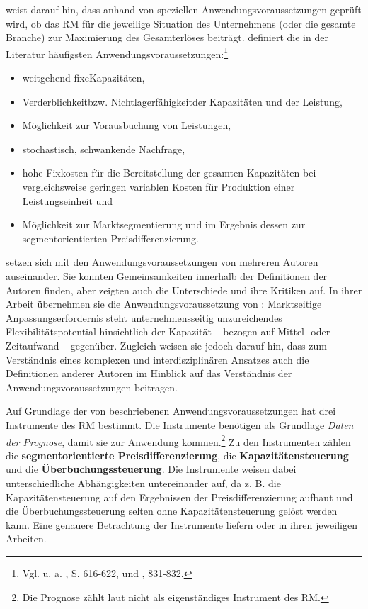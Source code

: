 \cite{Petrick:2009aa} weist da\-rauf hin, dass anhand von speziellen Anwendungsvoraussetzungen geprüft wird, ob das RM für die jeweilige Situation des Unternehmens (oder die gesamte Branche) zur Maximierung des Gesamterlöses beiträgt. \cite{kimes1989yield} definiert die in der Literatur häufigsten Anwendungsvoraussetzungen:\footnote{Vgl. u. a. \cite{friege1996yield}, S. 616-622, und \cite{weatherford1992taxonomy}, 831-832.}
\begin{itemize}
	\item \glqq weitgehend fixe\grqq\;Kapazitäten,
	\item \glqq Verderblichkeit\grqq\;bzw. \glqq Nichtlagerfähigkeit\grqq\;der Kapazitäten und der Leistung,
	\item Möglichkeit zur Vorausbuchung von Leistungen,
	\item stochastisch, schwankende Nachfrage,
	\item hohe Fixkosten für die Bereitstellung der gesamten Kapazitäten bei vergleichsweise geringen variablen Kosten für Produktion einer Leistungseinheit und
	\item Möglichkeit zur Marktsegmentierung und im Ergebnis dessen zur segmentorientierten Preisdifferenzierung.
\end{itemize}
\vspace{0.2cm}

\cite{Klein:2008aa} setzen sich mit den Anwendungsvoraussetzungen von mehreren Autoren auseinander. Sie konnten Gemeinsamkeiten innerhalb der Definitionen der Autoren finden, aber zeigten auch die Unterschiede und ihre Kritiken auf. In ihrer Arbeit übernehmen sie die Anwendungsvoraussetzung von \cite{corsten1998yield}: \glqq Marktseitige Anpassungserfordernis steht unternehmensseitig unzureichendes Flexibilitätspotential hinsichtlich der Kapazität -- bezogen auf Mittel- oder Zeitaufwand -- gegenüber\grqq. Zugleich weisen sie jedoch darauf hin, dass zum Verständnis eines komplexen und interdisziplinären Ansatzes auch die Definitionen anderer Autoren im Hinblick auf das Verständnis der Anwendungsvoraussetzungen beitragen.

Auf Grundlage der von \cite{friege1996yield} beschriebenen Anwendungsvoraussetzungen hat \cite{Petrick:2009aa} drei Instrumente des RM bestimmt. Die Instrumente benötigen als Grundlage \textit{Daten der Prognose}, damit sie zur Anwendung kommen.\footnote{Die Prognose zählt laut \cite{Petrick:2009aa} nicht als eigenständiges Instrument des RM.} Zu den Instrumenten zählen die \textbf{segmentorientierte Preisdifferenzierung}, die \textbf{Kapazitäten\-steuerung} und die \textbf{Über\-buchungssteuerung}. Die Instrumente weisen dabei unterschiedliche Ab\-hängigkeit\-en untereinander auf, da z. B. die Kapazitä\-tensteu\-erung auf den Ergebnissen der Preisdifferenzierung aufbaut und die Überbuchungssteuerung selten ohne Kapazitätensteuerung gelöst werden kann. Eine genauere Betrachtung der Instrumente liefern \cite{talluri2004theory} oder \cite{Petrick:2009aa} in ihren jeweiligen Arbeiten.


